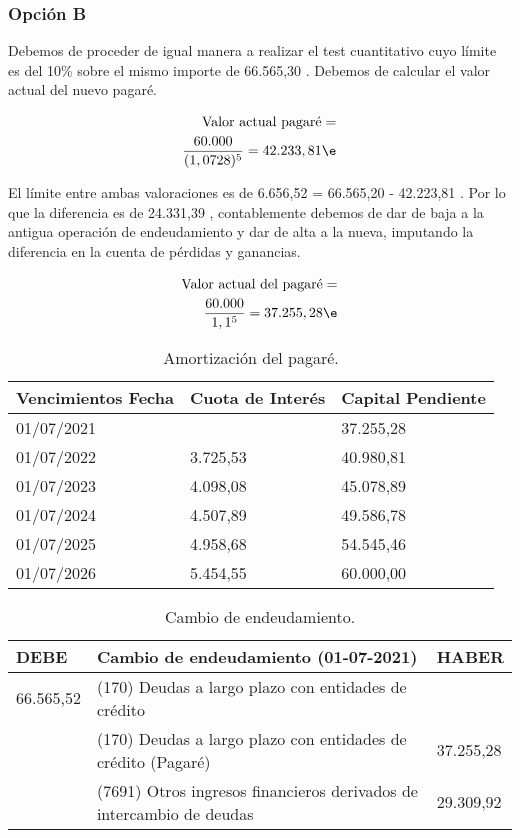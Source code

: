 \subsubsection*{Opción B}

Debemos de proceder de igual manera a realizar el test cuantitativo cuyo límite es del 10\% sobre el mismo importe de 66.565,30 \e. Debemos de calcular el valor actual del nuevo pagaré.

\begin{align*}
    \text{Valor actual pagaré} = \\
    \frac{\text{60.000}}{(1,0728)^5} = 42.233,81 \e
\end{align*}

El límite entre ambas valoraciones es de 6.656,52 \e = 66.565,20 - 42.223,81 \e. Por lo que la diferencia es de 24.331,39 \e, contablemente debemos de dar de baja a la antigua operación de endeudamiento y dar de alta a la nueva, imputando la diferencia en la cuenta de pérdidas y ganancias.

\begin{align*}
    \text{Valor actual del pagaré} = \\
    \frac{\text{60.000}}{1,1^5} = 37.255,28 \e
\end{align*}

\begin{table}[H]
    \centering
    \begin{tabular}{|p{2cm}|p{2cm}|p{2cm}|}
    \hline
    \rowcolor{blue!30}
    \textbf{Vencimientos Fecha} & \textbf{Cuota de Interés} & \textbf{Capital Pendiente} \\
    \hline
    01/07/2021 & & 37.255,28 \\
    \hline
    01/07/2022 & 3.725,53 & 40.980,81 \\
    \hline
    01/07/2023 & 4.098,08 & 45.078,89 \\
    \hline
    01/07/2024 & 4.507,89 & 49.586,78 \\
    \hline
    01/07/2025 & 4.958,68 & 54.545,46 \\
    \hline
    01/07/2026 & 5.454,55 & 60.000,00 \\
    \hline
    \end{tabular}
    \caption{Amortización del pagaré.}
    \label{tabla:amortizacion_pagare}
\end{table}

\begin{table}[H]
    \centering
    \begin{tabular}{|p{2cm}|p{6cm}|p{2cm}|}
    \hline
    \rowcolor{blue!30}
    \textbf{DEBE} & \textbf{Cambio de endeudamiento (01-07-2021)} & \textbf{HABER} \\
    \hline
    66.565,52 & (170) Deudas a largo plazo con entidades de crédito & \\
    \hline
    & (170) Deudas a largo plazo con entidades de crédito (Pagaré) & 37.255,28 \\
    \hline
    & (7691) Otros ingresos financieros derivados de intercambio de deudas & 29.309,92 \\
    \hline
    \end{tabular}
    \caption{Cambio de endeudamiento.}
    \label{tabla:cambio_endeudamiento}
\end{table}


